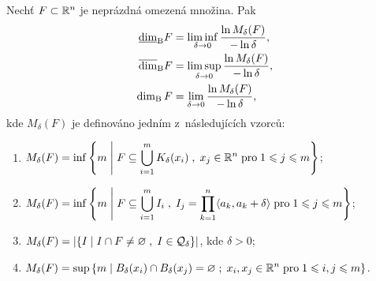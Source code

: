 \begin{theorem}\label{thm:ekvivalentni-def-box-counting-dimenze}
    Nechť $F\subset \mathbb{R}^n$ je neprázdná omezená množina. Pak
    \begin{align*}
        \underline{\dim}_\textup{B}{F}&=\liminf_{\delta\to 0}\dfrac{\ln{M_\delta(F)}}{-\ln{\delta}},\\
        \overline{\dim}_\textup{B}{F}&=\limsup_{\delta\to 0}\dfrac{\ln{M_\delta(F)}}{-\ln{\delta}},\\
        \operatorname{dim_B}{F}&=\lim_{\delta\to 0}\dfrac{\ln{M_\delta(F)}}{-\ln{\delta}},
    \end{align*}
    kde $M_\delta(F)$ je definováno jedním z~následujících vzorců:
    \begin{enumerate}[label=(\roman*)]
        \item\label{thm:pokryti-delta-uz-koulemi} $\displaystyle M_\delta(F)=\inf\left\{m\;\middle|\;F\subseteq\bigcup\limits_{i=1}^m K_\delta(x_i)\;,\;x_j\in\mathbb{R}^n\;\text{pro}\;1\leqslant j\leqslant m\right\}$;
        \item\label{thm:pokryti-delta-kvadry} $\displaystyle M_\delta(F)=\inf\left\{m\;\middle|\;F\subseteq\bigcup\limits_{i=1}^m I_i\;,\;I_j=\prod_{k=1}^{n}\langle a_k,a_k+\delta\rangle\;\text{pro}\;1\leqslant j\leqslant m\right\}$;
        \item\label{thm:pokryti-delta-sit} $\displaystyle M_\delta(F)=\left|\left\{I\;\middle|\;I\cap F\neq\varnothing\;,\;I\in\mathcal{Q}_\delta\right\}\right|$, kde $\delta>0$;
        \item\label{thm:pokryti-delta-dis-ot-koulemi} $\displaystyle M_\delta(F)=\sup\left\{m\;\middle|\;B_\delta(x_i)\cap B_\delta(x_j)=\varnothing\;;\;x_i,x_j\in\mathbb{R}^n\;\text{pro}\;1\leqslant i,j\leqslant m\right\}$.
    \end{enumerate}
\end{theorem}

